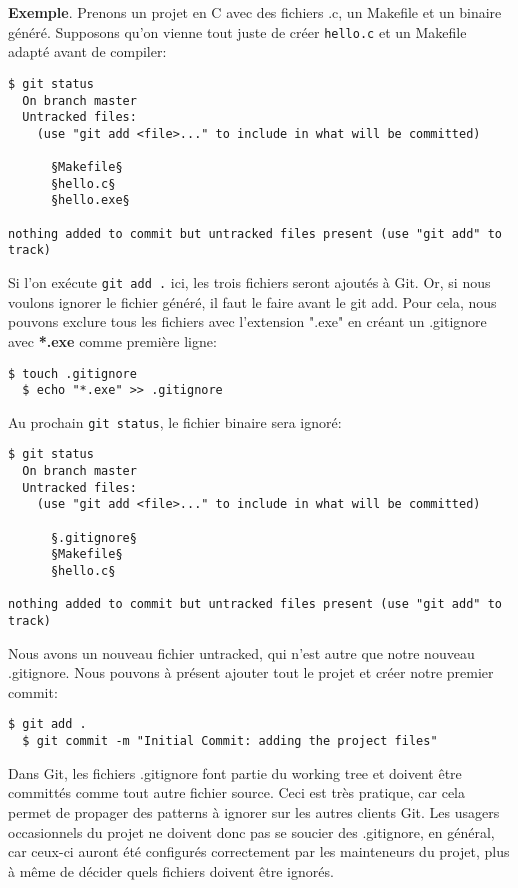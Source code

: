\documentclass{../../common/tufte-latex/tufte-handout}
\begin{document}
\noindent \textbf{Exemple}.
Prenons un projet en C avec des fichiers .c, un Makefile et un binaire généré.
Supposons qu'on vienne tout juste de créer \texttt{hello.c} et un Makefile adapté avant de compiler:

\begin{lstlisting}[style=BashInputStyle]
  $ git status
  On branch master
  Untracked files:
    (use "git add <file>..." to include in what will be committed)
  
      §Makefile§
      §hello.c§
      §hello.exe§

nothing added to commit but untracked files present (use "git add" to track)
\end{lstlisting}

Si l'on exécute \texttt{git add .} ici, les trois fichiers seront ajoutés à Git.
Or, si nous voulons ignorer le fichier généré, il faut le faire avant le git add. Pour cela, nous pouvons exclure tous les fichiers avec l'extension ".exe" en créant un .gitignore avec \textbf{*.exe} comme première ligne:

\begin{lstlisting}[style=BashInputStyle]
  $ touch .gitignore
  $ echo "*.exe" >> .gitignore
\end{lstlisting}

Au prochain \texttt{git status}, le fichier binaire sera ignoré:

\begin{lstlisting}[style=BashInputStyle]
  $ git status
  On branch master
  Untracked files:
    (use "git add <file>..." to include in what will be committed)
  
      §.gitignore§
      §Makefile§
      §hello.c§

nothing added to commit but untracked files present (use "git add" to track)
\end{lstlisting}

Nous avons un nouveau fichier untracked, qui n'est autre que notre nouveau .gitignore.
Nous pouvons à présent ajouter tout le projet et créer notre premier commit:

\begin{lstlisting}[style=BashInputStyle]
  $ git add .
  $ git commit -m "Initial Commit: adding the project files"
\end{lstlisting}

Dans Git, les fichiers .gitignore font partie du working tree et doivent être committés comme tout autre fichier source.
Ceci est très pratique, car cela permet de propager des patterns à ignorer sur les autres clients Git.
Les usagers occasionnels du projet ne doivent donc pas se soucier des .gitignore, en général, car ceux-ci auront été configurés correctement par les mainteneurs du projet, plus à même de décider quels fichiers doivent être ignorés.
\end{document}
